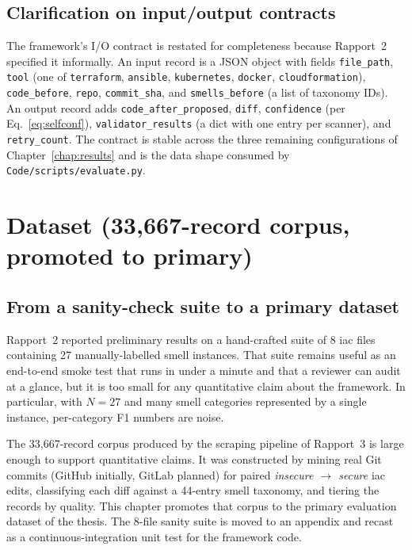 \documentclass[12pt, a4paper]{report}
\begin{document}
\section{Clarification on input/output contracts}

The framework's I/O contract is restated for completeness because Rapport~2
specified it informally. An input record is a JSON object with fields
\texttt{file\_path}, \texttt{tool} (one of \texttt{terraform}, \texttt{ansible},
\texttt{kubernetes}, \texttt{docker}, \texttt{cloudformation}),
\texttt{code\_before}, \texttt{repo}, \texttt{commit\_sha}, and
\texttt{smells\_before} (a list of taxonomy IDs). An output record adds
\texttt{code\_after\_proposed}, \texttt{diff}, \texttt{confidence} (per
Eq.~\ref{eq:selfconf}), \texttt{validator\_results} (a dict with one entry
per scanner), and \texttt{retry\_count}. The contract is stable across the
three remaining configurations of Chapter~\ref{chap:results} and is the
data shape consumed by \texttt{Code/scripts/evaluate.py}.

\chapter{Dataset (33{,}667-record corpus, promoted to primary)}
\label{chap:dataset}

\section{From a sanity-check suite to a primary dataset}

Rapport~2 reported preliminary results on a hand-crafted suite of 8
\gls{iac} files containing 27 manually-labelled smell instances. That suite
remains useful as an end-to-end smoke test that runs in under a minute and
that a reviewer can audit at a glance, but it is too small for any
quantitative claim about the framework. In particular, with $N\!\!=\!\!27$ and
many smell categories represented by a single instance, per-category
F1 numbers are noise.

The 33{,}667-record corpus produced by the scraping pipeline of Rapport~3
is large enough to support quantitative claims. It was constructed by
mining real Git commits (GitHub initially, GitLab planned) for paired
\emph{insecure $\to$ secure} \gls{iac} edits, classifying each diff against
a 44-entry smell taxonomy, and tiering the records by quality. This
chapter promotes that corpus to the primary evaluation dataset of the
thesis. The 8-file sanity suite is moved to an appendix and recast as a
continuous-integration unit test for the framework code.
\end{document}

